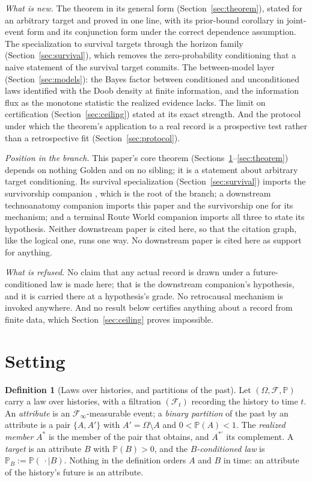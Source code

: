 \documentclass[11pt]{article}
\newcommand{\PP}{\mathbb{P}}
\newcommand{\Fc}{\mathcal{F}}
\theoremstyle{plain}
\theoremstyle{definition}
\newtheorem{definition}[theorem]{Definition}
\theoremstyle{remark}
\begin{document}
\emph{What is new.} The theorem in its general form
(Section~\ref{sec:theorem}), stated for an arbitrary target and proved
in one line, with its prior-bound corollary in joint-event form and its
conjunction form under the correct dependence assumption. The
specialization to survival targets through the horizon family
(Section~\ref{sec:survival}), which removes the zero-probability
conditioning that a naive statement of the survival target commits. The
between-model layer (Section~\ref{sec:models}): the Bayes factor between
conditioned and unconditioned laws identified with the Doob density at
finite information, and the information flux as the monotone statistic
the realized evidence lacks. The limit on certification
(Section~\ref{sec:ceiling}) stated at its exact strength. And the
protocol under which the theorem's application to a real record is a
prospective test rather than a retrospective fit
(Section~\ref{sec:protocol}).

\emph{Position in the branch.} This paper's core theorem
(Sections~\ref{sec:setting}--\ref{sec:theorem}) depends on nothing
Golden and on no sibling; it is a statement about arbitrary target
conditioning. Its survival specialization (Section~\ref{sec:survival})
imports the survivorship companion \cite{SurvA}, which is the root of
the branch; a downstream technoanatomy companion imports this paper and the
survivorship one for its mechanism; and a terminal Route World
companion imports all three to state its hypothesis. Neither downstream
paper is cited here, so that the citation graph, like the logical one,
runs one way. No downstream paper is cited here as support for
anything.

\emph{What is refused.} No claim that any actual record is drawn under a
future-conditioned law is made here; that is the downstream companion's
hypothesis, and it is carried there at a hypothesis's grade. No
retrocausal mechanism is invoked anywhere. And no result below certifies
anything about a record from finite data, which Section~\ref{sec:ceiling}
proves impossible.

\section{Setting}\label{sec:setting}

\begin{definition}[Laws over histories, and partitions of the past]
\label{def:setting}
Let $(\Omega,\Fc,\PP)$ carry a law over histories, with a filtration
$(\Fc_t)$ recording the history to time $t$. An \emph{attribute} is an
$\Fc_\infty$-measurable event; a \emph{binary partition} of the past by
an attribute is a pair $\{A,A'\}$ with $A'=\Omega\setminus A$ and
$0<\PP(A)<1$. The \emph{realized member} $A^\ast$ is the member of the
pair that obtains, and $A^{\ast\prime}$ its complement. A \emph{target} is
an attribute $B$ with $\PP(B)>0$, and the \emph{$B$-conditioned law} is
$\PP_B:=\PP(\,\cdot\mid B)$. Nothing in the definition orders $A$ and $B$
in time: an attribute of the history's future is an attribute.
\end{definition}
\end{document}
